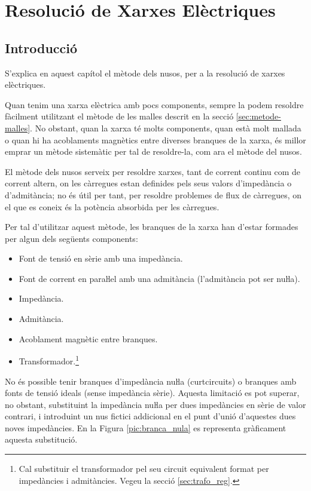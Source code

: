 \chapter{Resolució de Xarxes Elèctriques} \label{chap:nusos}
\section{Introducció}
S'explica en aquest capítol el
mètode dels nusos, per a la resolució de xarxes elèctriques.

Quan tenim una xarxa elèctrica amb pocs components, sempre la podem resoldre fàcilment
utilitzant el mètode de les malles descrit en la secció \vref{sec:metode-malles}. No obstant, quan la xarxa té molts components, quan està
 molt mallada o quan hi ha acoblaments magnètics entre diverses branques de la xarxa, és millor
 emprar un mètode sistemàtic per tal de resoldre-la, com ara el mètode del nusos.

El mètode dels nusos serveix per resoldre xarxes, tant de corrent
continu com de corrent altern, on les càrregues estan definides pels
seus valors d'impedància o d'admitància; no és útil per tant, per
resoldre problemes de flux de càrregues, on el que es coneix és la
potència absorbida per les càrregues.

Per tal d'utilitzar aquest mètode, les branques de la xarxa han d'estar
formades per algun dels següents components: \vspace{-1.5mm}
\begin{itemize}
   \item Font de tensió en sèrie amb una impedància.
   \item Font de corrent en paraŀlel amb una admitància (l'admitància pot ser nuŀla).
   \item Impedància.
   \item Admitància.
   \item Acoblament magnètic entre branques.
   \item Transformador.\footnote{Cal substituir el transformador pel seu circuit equivalent format per impedàncies i
   admitàncies. Vegeu la secció \ref{sec:trafo_reg}.}
\end{itemize}
\vspace{-1.5mm}

No és possible tenir branques d'impedància nuŀla (curtcircuits) o
branques amb fonts de tensió ideals (sense impedància sèrie).
Aquesta limitació es pot superar, no obstant, substituint la
impedància nuŀla per dues impedàncies en sèrie  de valor
contrari, i introduint un nus fictici addicional en el punt d'unió
d'aquestes dues noves impedàncies. En la Figura
\vref{pic:branca_nula}
 es representa gràficament aquesta substitució. 
\begin{center}
   
    \label{pic:branca_nula}
\end{center}

